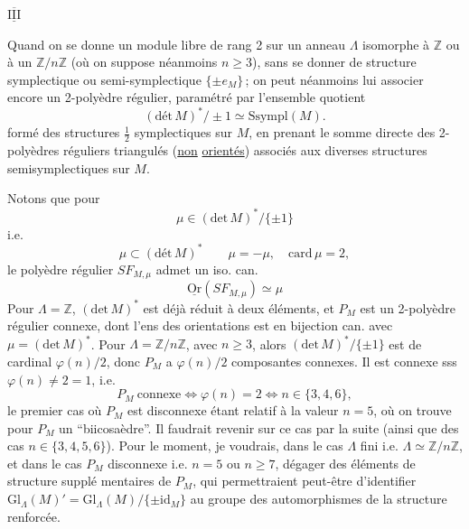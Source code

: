 \(\overline{\underline{\mathrm{III}}}\)

Quand on se donne un module libre  de rang 2 sur un anneau $\Lambda$  isomorphe à  $\mathbb Z$ ou à un $\mathbb Z/n\mathbb Z$ (où on suppose néanmoins $n\geqslant3$), sans se donner de structure symplectique  ou semi-symplectique $\{\pm e_M\}$\,; on peut néanmoins lui associer encore un 2-polyèdre  régulier,   paramétré par l'ensemble quotient
\[
(\mathrm{dét}\,M)^*/\pm1\simeq\mathrm{Ssympl}(M).\tag*{(89)}
\]
formé des structures $\tfrac12$ symplectiques sur $M$,
en prenant le  somme directe des 2-polyèdres réguliers triangulés (\uline{non} \uline{orientés}) associés aux diverses structures semisymplectiques sur $M$.

Notons que pour
\[
\mu\in(\mathrm{det}\,M)^*/\{\pm1\}\tag*{(90)}
\]
i.e.
\[
\mu\subset(\mathrm{dét}\,M)^*\qquad\mu=-\mu,\quad\mathrm{card}\,\mu=2,
\]
le  polyèdre régulier $SF_{M,\mu}$ admet un iso. can.
\[
\underline{\mathrm{Or}}(SF_{M,\mu})\simeq\mu\tag*{(91)}
\]
Pour $\Lambda=\mathbb Z$, $(\mathrm{det}\,M)^*$ est déjà réduit à deux éléments, et  $P_M$ est un 2-polyèdre régulier connexe, dont l'ens des orientations est en bijection can. avec $\mu=(\mathrm{det}\,M)^*$. Pour $\Lambda=\mathbb Z/n\mathbb Z$, avec $n\geqslant3$, alors $(\mathrm{det}\,M)^*/\{\pm1\}$ est de cardinal $\varphi(n)/2$, donc $P_M$ a $\varphi(n)/2$ composantes connexes. Il est connexe sss $\varphi(n)\ne2=1$, i.e.
\[
P_M\ \text{connexe}\iff\varphi(n)=2\iff n\in\{3,4,6\},\tag*{(92)}
\]
le premier cas où $P_M$ est disconnexe étant relatif à la valeur $n=5$, où on trouve pour $P_M$ un ``biicosaèdre''. Il faudrait revenir sur ce cas par la suite (ainsi que   des cas $n\in\{3,4,5,6\}$). Pour le moment, je voudrais, dans le cas $\Lambda$ fini i.e. $\Lambda\simeq\mathbb Z/n\mathbb Z$, et dans le cas $P_M$ disconnexe i.e. $n=5$ ou $n\geqslant7$, dégager des éléments de structure supplé%
%
%
mentaires de $P_M$, qui permettraient peut-être d'identifier $\mathrm{Gl}_\Lambda(M)'=\mathrm{Gl}_\Lambda(M)/\{\pm\mathrm{id}_M\}$ au groupe des automorphismes de la structure renforcée.

